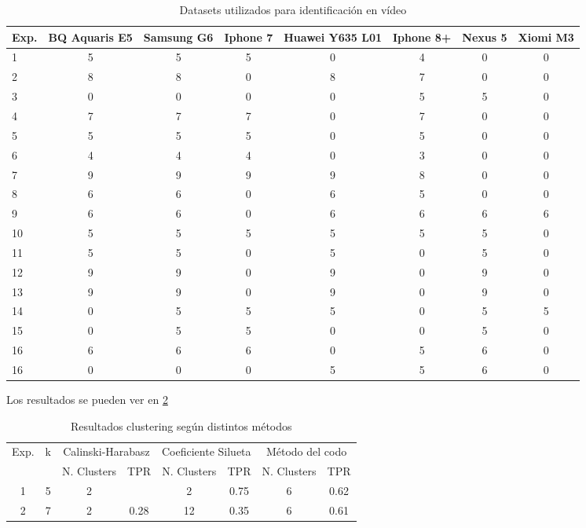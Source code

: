 \begin{table}[!htb]
    \tiny
    \centering
        \begin{tabular}{|l|c|c|c|c|c|c|c|}
        \hline
        \rowcolor[gray]{0.9}
        \textbf{Exp.} & \textbf{BQ Aquaris E5} & \textbf{Samsung G6} & \textbf{Iphone 7} & \textbf{Huawei Y635 L01} & \textbf{Iphone 8+} & \textbf{Nexus 5} & \textbf{Xiomi M3} \\ \hline
        1 & 5 & 5 & 5 & 0 & 4 & 0 & 0 \\ \hline
        2 & 8 & 8 & 0 & 8 & 7 & 0 & 0 \\ \hline
        3 & 0 & 0 & 0 & 0 & 5 & 5 & 0 \\ \hline
        4 & 7 & 7 & 7 & 0 & 7 & 0 & 0 \\ \hline
        5 & 5 & 5 & 5 & 0 & 5 & 0 & 0 \\ \hline
        6 & 4 & 4 & 4 & 0 & 3 & 0 & 0 \\ \hline
        7 & 9 & 9 & 9 & 9 & 8 & 0 & 0 \\ \hline
        8 & 6 & 6 & 0 & 6 & 5 & 0 & 0 \\ \hline
        9 & 6 & 6 & 0 & 6 & 6 & 6 & 6 \\ \hline
        10 & 5 & 5 & 5 & 5 & 5 & 5 & 0 \\ \hline
        11 & 5 & 5 & 0 & 5 & 0 & 5 & 0 \\ \hline
        12 & 9 & 9 & 0 & 9 & 0 & 9 & 0 \\ \hline
        13 & 9 & 9 & 0 & 9 & 0 & 9 & 0 \\ \hline
        14 & 0 & 5 & 5 & 5 & 0 & 5 & 5 \\ \hline
        15 & 0 & 5 & 5 & 0 & 0 & 5 & 0 \\ \hline
        16 & 6 & 6 & 6 & 0 & 5 & 6 & 0 \\ \hline
        16 & 0 & 0 & 0 & 5 & 5 & 6 & 0 \\ \hline
        \end{tabular}
    \caption{Datasets utilizados para identificación en vídeo}
    \label{tabla:10exp}
\end{table}

Los resultados se pueden ver en \ref{tabla:resultados}

\begin{table}[!htb]
    \centering
        \begin{tabular}{| c | c || c | c || c | c || c | c ||}
        \hline
        \multirow{2}{*}{Exp.} & \multirow{2}{*}{k} & \multicolumn{2}{c||}{Calinski-Harabasz} & \multicolumn{2}{c||}{Coeficiente Silueta} & \multicolumn{2}{c||}{Método del codo} \\ 
        \cline{3-8}
          &   & N. Clusters & TPR & N. Clusters & TPR  & N. Clusters & TPR \\ \hline
        1 & 5 & 2           &  & 2 & 0.75 & 6 & 0.62  \\ \hline 
        2 & 7 & 2           & 0.28 & 12 & 0.35  & 6 & 0.61 \\ \hline 
        \end{tabular}
    \caption{Resultados clustering según distintos métodos}
    \label{tabla:resultados}
\end{table}

